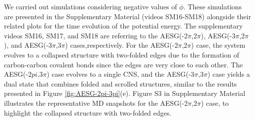 \documentclass[twoside,twocolumn,9pt]{article}
\begin{document}
We carried out simulations considering negative values of $\phi$. These simulations are presented in the Supplementary Material (videos SM16-SM18) alongside their related plots for the time evolution of the potential energy. The supplementary videos SM16, SM17, and SM18 are referring to the AESG(-2$\pi$,2$\pi$), AESG(-3$\pi$,2$\pi$), and  AESG(-3$\pi$,3$\pi$) cases,respectively. For the AESG(-2$\pi$,2$\pi$) case, the system evolves to a collapsed structure with two-folded edges due to the formation of carbon-carbon covalent bonds since the edges are very close to each other. The AESG(-2$pi$,3$\pi$) case evolves to a single CNS, and the AESG(-3$\pi$,3$\pi$) case yields a dual state that combines folded and scrolled structures, similar to the results presented in Figure \ref{fig:AESG-2pi-3pi}(e). Figure S3 in Supplementary Material illustrates the representative MD snapshots for the AESG(-2$\pi$,2$\pi$) case, to highlight the collapsed structure with two-folded edges.
\end{document}
